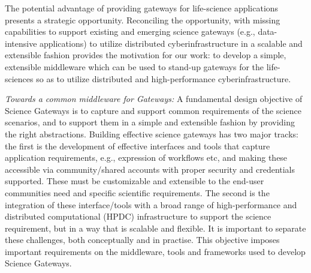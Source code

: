 \documentclass[]{svjour3}
\begin{document}
The potential advantage of providing gateways for life-science
applications presents a strategic opportunity.  Reconciling the
opportunity, with missing capabilities to support existing and
emerging science gateways (e.g., data-intensive applications) to
utilize distributed cyberinfrastructure in a scalable and extensible
fashion provides the motivation for our work: to develop a simple,
extensible middleware which can be used to stand-up gateways for the
life-sciences so as to utilize distributed and high-performance
cyberinfrastructure. 



{\it Towards a common middleware for Gateways:} A fundamental design
objective of Science Gateways is to capture and support common
requirements of the science scenarios, and to support them in a simple
and extensible fashion by providing the right abstractions.  Building
effective science gateways has two major tracks: the first is the
development of effective interfaces and tools that capture application
requirements, e.g., expression of workflows etc, and making these
accessible via community/shared accounts with proper security and
credentials supported. These must be customizable and extensible to
the end-user communities need and specific scientific
requirements. The second is the integration of these interface/tools
with a broad range of high-performance and distributed computational
(HPDC) infrastructure to support the science requirement, but in a way
that is scalable and flexible.  It is important to separate these
challenges, both conceptually and in practise.  This objective imposes
important requirements on the middleware, tools and frameworks used to
develop Science Gateways.
\end{document}
